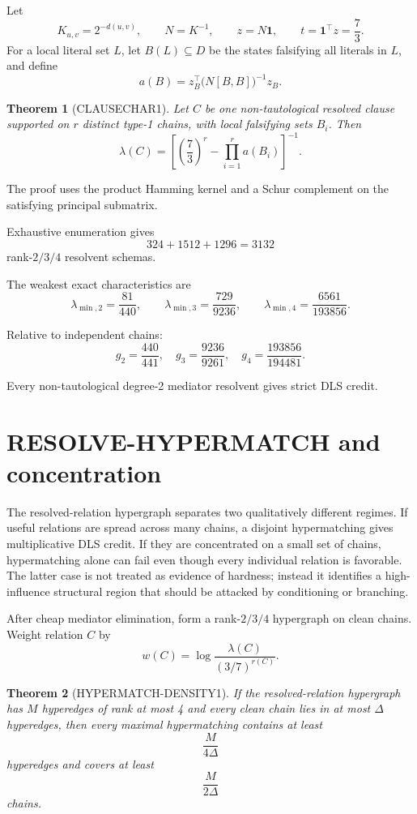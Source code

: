 \documentclass[11pt]{article}
\theoremstyle{plain}
\newtheorem{theorem}{Theorem}[section]
\theoremstyle{definition}
\theoremstyle{remark}
\begin{document}
Let
\[
K_{u,v}=2^{-d(u,v)},\qquad
N=K^{-1},\qquad
z=N\mathbf1,\qquad
t=\mathbf1^\top z=\frac73.
\]
For a local literal set $L$, let $B(L)\subseteq D$ be the states falsifying
all literals in $L$, and define
\[
a(B)=
z_B^\top
\bigl(N[B,B]\bigr)^{-1}
z_B.
\]

\begin{theorem}[CLAUSECHAR1]
Let $C$ be one non-tautological resolved clause supported on $r$ distinct
type-1 chains, with local falsifying sets $B_i$. Then
\[
\boxed{
\lambda(C)=
\left[
\left(\frac73\right)^r
-
\prod_{i=1}^{r}a(B_i)
\right]^{-1}.
}
\]
\end{theorem}

The proof uses the product Hamming kernel and a Schur complement on the
satisfying principal submatrix.

Exhaustive enumeration gives
\[
324+1512+1296=3132
\]
rank-$2/3/4$ resolvent schemas.

The weakest exact characteristics are
\[
\boxed{\lambda_{\min,2}=\frac{81}{440}},
\qquad
\boxed{\lambda_{\min,3}=\frac{729}{9236}},
\qquad
\boxed{\lambda_{\min,4}=\frac{6561}{193856}}.
\]

Relative to independent chains:
\[
\boxed{
g_2=\frac{440}{441},\quad
g_3=\frac{9236}{9261},\quad
g_4=\frac{193856}{194481}.
}
\]

\begin{provedbox}
Every non-tautological degree-2 mediator resolvent gives strict DLS credit.
\end{provedbox}

\section{RESOLVE-HYPERMATCH and concentration}

The resolved-relation hypergraph separates two qualitatively different
regimes. If useful relations are spread across many chains, a disjoint
hypermatching gives multiplicative DLS credit. If they are concentrated on a
small set of chains, hypermatching alone can fail even though every individual
relation is favorable. The latter case is not treated as evidence of hardness;
instead it identifies a high-influence structural region that should be
attacked by conditioning or branching.

After cheap mediator elimination, form a rank-$2/3/4$ hypergraph on clean
chains. Weight relation $C$ by
\[
w(C)=\log\frac{\lambda(C)}{(3/7)^{r(C)}}.
\]

\begin{theorem}[HYPERMATCH-DENSITY1]
If the resolved-relation hypergraph has $M$ hyperedges of rank at most 4 and
every clean chain lies in at most $\Delta$ hyperedges, then every maximal
hypermatching contains at least
\[
\boxed{\frac{M}{4\Delta}}
\]
hyperedges and covers at least
\[
\boxed{\frac{M}{2\Delta}}
\]
chains.
\end{theorem}
\end{document}

